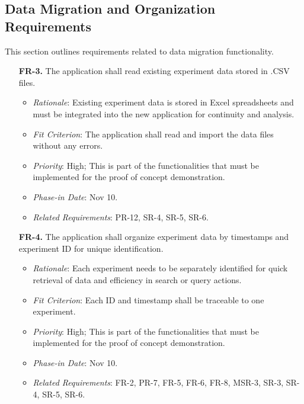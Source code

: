 \documentclass[12pt]{article}
\begin{document}
\subsection{Data Migration and Organization Requirements}
This section outlines requirements related to data migration functionality.
  \begin{enumerate}
    \item[\textbf{FR-3.}] The application shall read existing experiment data stored in .CSV files.
    \begin{itemize}
      \item \textit{Rationale}: Existing experiment data is stored in Excel spreadsheets and must be integrated into the new application for continuity and analysis.
      \item \textit{Fit Criterion}: The application shall read and import the data files without any errors.
      \item \textit{Priority}: High; This is part of the functionalities that must be implemented for the proof of concept demonstration.
      \item \textit{Phase-in Date}: Nov 10.
      \item \textit{Related Requirements}: PR-12, SR-4, SR-5, SR-6.
    \end{itemize}
    \item[\textbf{FR-4.}] The application shall organize experiment data by timestamps and experiment ID for unique identification.
    \begin{itemize}
      \item \textit{Rationale}: Each experiment needs to be separately identified for quick retrieval of data and efficiency in search or query actions.
      \item \textit{Fit Criterion}: Each ID and timestamp shall be traceable to one experiment.
      \item \textit{Priority}: High; This is part of the functionalities that must be implemented for the proof of concept demonstration.
      \item \textit{Phase-in Date}: Nov 10.
      \item \textit{Related Requirements}: FR-2, PR-7, FR-5, FR-6, FR-8, MSR-3, SR-3, SR-4, SR-5, SR-6.
    \end{itemize}
  \end{enumerate}
\end{document}
